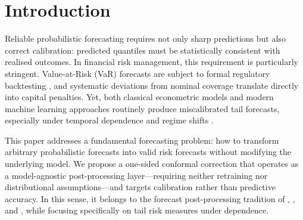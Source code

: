 \documentclass[preprint,11pt,authoryear]{elsarticle}
\newcommand{\1}{\boldsymbol{1}}
\begin{document}
\begin{frontmatter}
\begin{abstract}
			The framework is evaluated on five time series foundation models
			and four classical benchmarks across 24 financial assets over
			2000--2026. Conformal recalibration restores nominal coverage
			across the large majority of model--asset combinations (86.6\%
			Basel Green Zone, zero Red), revealing a clear
			calibration--efficiency trade-off. A rolling variant adapts to
			local market conditions, further improving conditional coverage.
			
			\bigskip\noindent
			\textbf{Keywords:} Conformal prediction; probabilistic forecast calibration; Value at Risk; time series foundation models; distribution-free recalibration; temporal dependence; quantile score
			
			\bigskip\noindent
			\textbf{JEL:} C14\,|\,C53\,|\,C58\,|\,G17\,|\,G32
		\end{abstract}
		
	\end{frontmatter}
	
	\section{Introduction}
	\label{sec:intro}
	
	Reliable probabilistic forecasting requires not only sharp
	predictions but also correct calibration: predicted quantiles
	must be statistically consistent with realised outcomes. In
	financial risk management, this requirement is particularly
	stringent. Value-at-Risk (VaR) forecasts are subject to formal
	regulatory backtesting \citep{basel1996}, and systematic
	deviations from nominal coverage translate directly into
	capital penalties. Yet, both classical econometric models and
	modern machine learning approaches routinely produce
	miscalibrated tail forecasts, especially under temporal
	dependence and regime shifts
	\citep{christoffersen1998, nolde2017elicitability,
		goel2024tsfmvar, pele2025llmvar}.
	
	This paper addresses a fundamental forecasting problem: how to
	transform arbitrary probabilistic forecasts into valid risk
	forecasts without modifying the underlying model. We propose a
	one-sided conformal correction that operates as a model-agnostic
	post-processing layer---requiring neither retraining nor
	distributional assumptions---and targets calibration rather than
	predictive accuracy. In this sense, it belongs to the forecast
	post-processing tradition of \citet{gneiting2013combining},
	\citet{brehmer2021properification}, and
	\citet{taillardat2016calibrated}, while focusing specifically
	on tail risk measures under dependence.
	
\end{document}
